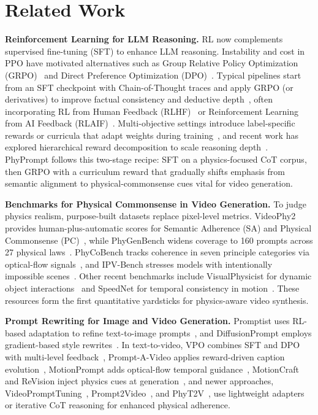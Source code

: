 \section{Related Work}
\label{sec:related}

\noindent\textbf{Reinforcement Learning for LLM Reasoning.}
RL now complements supervised fine-tuning (SFT) to enhance LLM reasoning.
Instability and cost in PPO have motivated alternatives such as Group Relative Policy Optimization (GRPO)~\cite{shao2024grpo,li2025mogrp} and Direct Preference Optimization (DPO)~\cite{goffer2023dpo}.
Typical pipelines start from an SFT checkpoint with Chain-of-Thought traces and apply GRPO (or derivatives) to improve factual consistency and deductive depth~\cite{yue2025cot,zhang2025sgrpo}, often incorporating RL from Human Feedback (RLHF)~\cite{outrun2023rlhf} or Reinforcement Learning from AI Feedback (RLAIF)~\cite{rajesh2024rlaif}.
Multi-objective settings introduce label-specific rewards or curricula that adapt weights during training~\cite{chen2025emorl,shibata2025dynamicrl}, and recent work has explored hierarchical reward decomposition to scale reasoning depth~\cite{nakano2023hapt}.
PhyPrompt follows this two-stage recipe: SFT on a physics-focused CoT corpus, then GRPO with a curriculum reward that gradually shifts emphasis from semantic alignment to physical-commonsense cues vital for video generation.

\noindent\textbf{Benchmarks for Physical Commonsense in Video Generation.}
To judge physics realism, purpose-built datasets replace pixel-level metrics.
VideoPhy2 provides human-plus-automatic scores for Semantic Adherence (SA) and Physical Commonsense (PC)~\cite{bansal2025videophy2}, while PhyGenBench widens coverage to 160 prompts across 27 physical laws~\cite{phygenbench2024}.
PhyCoBench tracks coherence in seven principle categories via optical-flow signals~\cite{chen2025phycobench}, and IPV-Bench stresses models with intentionally impossible scenes~\cite{wang2025ipvbench}.
Other recent benchmarks include VisualPhysicist for dynamic object interactions~\cite{singh2024visualphysicist} and SpeedNet for temporal consistency in motion~\cite{kim2023speednet}.
These resources form the first quantitative yardsticks for physics-aware video synthesis.

\noindent\textbf{Prompt Rewriting for Image and Video Generation.}
Promptist uses RL-based adaptation to refine text-to-image prompts~\cite{hao2023promptist}, and DiffusionPrompt employs gradient-based style rewrites~\cite{lee2023diffusionprompt}. In text-to-video, VPO combines SFT and DPO with multi-level feedback~\cite{cheng2025vpo}, Prompt-A-Video applies reward-driven caption evolution~\cite{ji2024prompt}, MotionPrompt adds optical-flow temporal guidance~\cite{nam2024motionprompt}, MotionCraft and ReVision inject physics cues at generation~\cite{agnolucci2024motioncraft,wang2025revision}, and newer approaches, VideoPromptTuning~\cite{xu2024vpt}, Prompt2Video~\cite{fernandez2024prompt2video}, and PhyT2V~\cite{xue2024phyt2v}, use lightweight adapters or iterative CoT reasoning for enhanced physical adherence.

